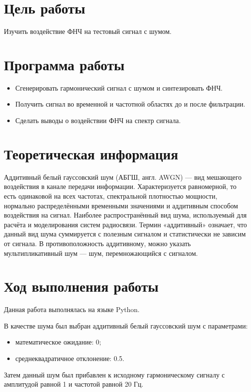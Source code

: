 
\usepackage{minted}




\setcounter{page}{2}



\section{Цель работы}
Изучить воздействие ФНЧ на тестовый сигнал с шумом.

\section{Программа работы}
\begin{itemize}
	\item Сгенерировать гармонический сигнал с шумом и синтезировать ФНЧ.
	\item Получить сигнал во временной и частотной областях до и после фильтрации.
	\item Сделать выводы о воздействии ФНЧ на спектр сигнала.
\end{itemize}

\section{Теоретическая информация}
Аддитивный белый гауссовский шум (АБГШ, англ. AWGN) — вид мешающего воздействия в канале передачи информации. Характеризуется равномерной, то есть одинаковой на всех частотах, спектральной плотностью мощности, нормально распределёнными временными значениями и аддитивным способом воздействия на сигнал. Наиболее распространённый вид шума, используемый для расчёта и моделирования систем радиосвязи. Термин «аддитивный» означает, что данный вид шума суммируется с полезным сигналом и статистически не зависим от сигнала. В противоположность аддитивному, можно указать мультипликативный шум — шум, перемножающийся с сигналом.

\newpage
\section{Ход выполнения работы}
Данная работа выполнялась на языке Python.

В качестве шума был выбран аддитивный белый гауссовский шум с параметрами: 
\begin{itemize}
	\item математическое ожидание: 0;
	\item среднеквадратичное отклонение: 0.5.
\end{itemize}
Затем данный шум был прибавлен к исходному гармоническому сигналу с амплитудой равной 1 и частотой равной 20 Гц.

